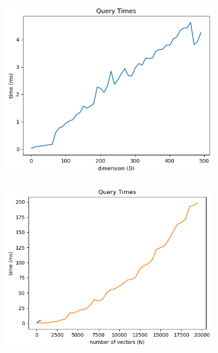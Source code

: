 \documentclass [a4paper, 11pt] {article}
\begin{document}
\begin{enumerate}
	\begin{figure}[!h]
		\centering
		\begin{subfigure}{0.4\textwidth}
			\centering
			\includegraphics[width=\textwidth]{1_1_a.png}
			\caption{}
		\end{subfigure}
		\begin{subfigure}{0.4\textwidth}
			\centering
			\includegraphics[width=\textwidth]{1_1_b.png}
			\caption{}
		\end{subfigure}
		\begin{subfigure}{0.45\textwidth}
			\centering

\end{subfigure}
\end{figure}
\end{enumerate}
\end{document}
